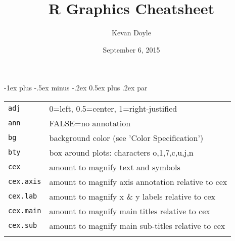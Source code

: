 \documentclass[landscape]{article}
\title{R Graphics Cheatsheet}
\author{Kevan Doyle}
\date{September 6, 2015}
\makeatletter
\renewcommand{\section}{\@startsection{section}{1}{0mm}%
                                {-1ex plus -.5ex minus -.2ex}%
                                {0.5ex plus .2ex}%
                                {\normalfont\large\bfseries}}
\makeatother
\begin{document}
\maketitle


\raggedright
\footnotesize

\begin{multicols}{3}


\setlength{\premulticols}{1pt}
\setlength{\postmulticols}{1pt}
\setlength{\multicolsep}{1pt}
\setlength{\columnsep}{2pt}

\section{par}
\begin{tabular}[t]{@{}p{}p{}@{}}
\hline
\verb|adj| & 0=left, 0.5=center, 1=right-justified \\
\verb|ann| & FALSE=no annotation \\
\verb|bg| & background color (see 'Color Specification') \\
\verb|bty| & box around plots: characters o,1,7,c,u,j,n \\
\verb|cex| & amount to magnify text and symbols \\
\verb|cex.axis| & amount to magnify axis annotation relative to cex \\
\verb|cex.lab| & amount to magnify x \& y labels relative to cex \\
\verb|cex.main| & amount to magnify main titles relative to cex \\
\verb|cex.sub| & amount to magnify main sub-titles relative to cex \\
\hline
\verb||
\end{tabular}
\vfill\columnbreak



\end{multicols}
\end{document}
